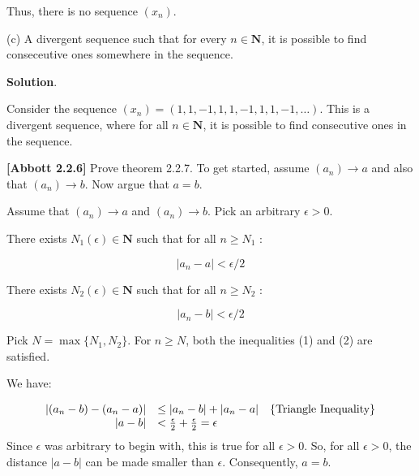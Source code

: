 \documentclass[10pt]{article}
\begin{document}
Thus, there is no sequence $\displaystyle ( x_{n})$. 



(c) A divergent sequence such that for every $\displaystyle n\in \mathbf{N}$, it is possible to find conseceutive ones somewhere in the sequence.



\textbf{Solution}.



Consider the sequence $\displaystyle ( x_{n}) =( 1,1,-1,1,1,-1,1,1,-1,\dotsc )$. This is a divergent sequence, where for all $\displaystyle n\in \mathbf{N}$, it is possible to find consecutive ones in the sequence.



\textbf{[Abbott 2.2.6]} Prove theorem 2.2.7. To get started, assume $\displaystyle ( a_{n})\rightarrow a$ and also that $\displaystyle ( a_{n})\rightarrow b$. Now argue that $\displaystyle a=b$.



Assume that $\displaystyle ( a_{n})\rightarrow a$ and $\displaystyle ( a_{n})\rightarrow b$. Pick an arbitrary $\displaystyle \epsilon  >0$. 



There exists $\displaystyle N_{1}( \epsilon ) \in \mathbf{N}$ such that for all $\displaystyle n\geq N_{1}$ :


\begin{equation}
|a_{n} -a|< \epsilon /2
\end{equation}


There exists $\displaystyle N_{2}( \epsilon ) \in \mathbf{N}$ such that for all $\displaystyle n\geq N_{2}$ :


\begin{equation}
|a_{n} -b|< \epsilon /2
\end{equation}


Pick $\displaystyle N=\max\{N_{1} ,N_{2}\}$. For $\displaystyle n\geq N$, both the inequalities (1) and (2) are satisfied. 



We have:


\begin{equation*}
\begin{array}{ r l c }
|( a_{n} -b) -( a_{n} -a) | & \leq |a_{n} -b|+|a_{n} -a| & \left\{\text{Triangle Inequality}\right\}\\
|a-b| & < \frac{\epsilon }{2} +\frac{\epsilon }{2} =\epsilon  & 
\end{array}
\end{equation*}
Since $\displaystyle \epsilon $ was arbitrary to begin with, this is true for all $\displaystyle \epsilon  >0$. So, for all $\displaystyle \epsilon  >0$, the distance $\displaystyle |a-b|$ can be made smaller than $\displaystyle \epsilon $. Consequently, $\displaystyle a=b$.
\end{document}
